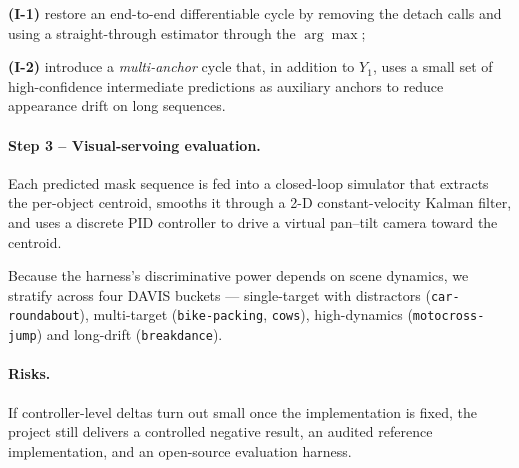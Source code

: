 \documentclass{article}
\begin{document}
\textbf{(I-1)} restore an end-to-end differentiable cycle by removing
the detach calls and using a straight-through estimator through the
$\arg\max$;

\textbf{(I-2)} introduce a \emph{multi-anchor} cycle that,
in addition to $Y_1$, uses a small set of high-confidence intermediate
predictions as auxiliary anchors to reduce appearance drift on long
sequences.

\paragraph{Step 3 -- Visual-servoing evaluation.}
Each predicted mask sequence is fed into a closed-loop simulator that
extracts the per-object centroid, smooths it through a 2-D
constant-velocity Kalman filter, and uses a discrete PID controller to
drive a virtual pan--tilt camera toward the centroid.

Because the harness's discriminative power depends on scene dynamics,
we stratify across four DAVIS buckets --- single-target with
distractors (\texttt{car-roundabout}), multi-target
(\texttt{bike-packing}, \texttt{cows}), high-dynamics
(\texttt{motocross-jump}) and long-drift (\texttt{breakdance}). 

\paragraph{Risks.}
If controller-level deltas turn out small once the implementation is
fixed, the project still delivers a controlled negative result, an
audited reference implementation, and an open-source evaluation
harness.
\end{document}
